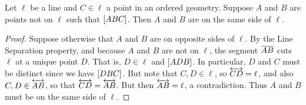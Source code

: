 \begin{lem}
Let \(\ell\) be a line and \(C \in \ell\) a point in an ordered geometry.
Suppose \(A\) and \(B\) are points not on \(\ell\) such that \([ A B C ]\).
Then \(A\) and \(B\) are on the same side of \(\ell\).
\end{lem}

\begin{proof}
Suppose otherwise that \(A\) and \(B\) are on opposite sides of \(\ell\).
By the Line Separation property, and because \(A\) and \(B\) are not on \(\ell\), the segment \(\overline{AB}\) cuts \(\ell\) at a unique point \(D\).
That is, \(D \in \ell\) and \([ A D B ]\).
In particular, \(D\) and \(C\) must be distinct since we have \([ D B C ]\).
But note that \(C, D \in \ell\), so \(\overleftrightarrow{CD} = \ell\), and also \(C, D \in \overleftrightarrow{AB}\), so that \(\overleftrightarrow{CD} = \overleftrightarrow{AB}\).
But then \(\overleftrightarrow{AB} = \ell\), a contradiction.
Thus \(A\) and \(B\) must be on the same side of \(\ell\).
\end{proof}

\Exercises%
